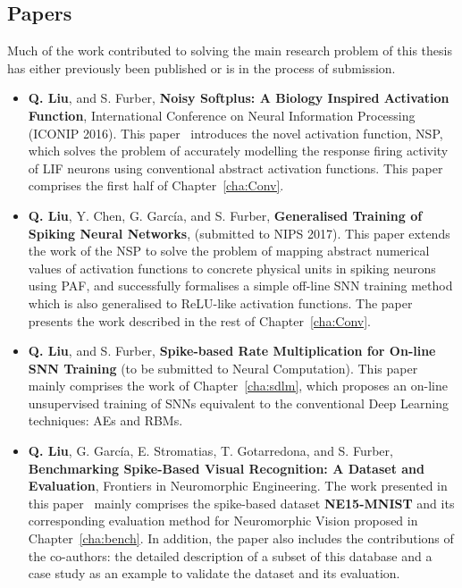 \subsection{Papers}
	Much of the work contributed to solving the main research problem of this thesis has either previously been published or is in the process of submission.
\begin{itemize}

	\item 
	\textbf{Q. Liu}, and S. Furber, \textbf{Noisy Softplus: A Biology Inspired Activation Function}, International Conference on Neural Information Processing (ICONIP 2016). 
	This paper~\citep{liu2016noisy} introduces the novel activation function, NSP, 
	which solves the problem of accurately modelling the response firing activity of LIF neurons using conventional abstract activation functions.
	This paper comprises the first half of Chapter~\ref{cha:Conv}.
	
	\item 
	\textbf{Q. Liu}, Y. Chen, G. Garc\'ia, and S. Furber, \textbf{Generalised Training of Spiking Neural Networks}, (submitted to NIPS 2017).
	This paper extends the work of the NSP to solve the problem of mapping abstract numerical values of activation functions to concrete physical units in spiking neurons using PAF, and successfully formalises a simple off-line SNN training method which is also generalised to ReLU-like activation functions.
	The paper presents the work described in the rest of Chapter~\ref{cha:Conv}.
	
	
	\item 
	\textbf{Q. Liu}, and S. Furber, \textbf{Spike-based Rate Multiplication for On-line SNN Training} (to be submitted to Neural Computation).
	This paper mainly comprises the work of Chapter~\ref{cha:sdlm}, which proposes an on-line unsupervised training of SNNs equivalent to the conventional Deep Learning techniques: AEs and RBMs.
	
	\item 
	\textbf{Q. Liu}, G. Garc\'ia, E. Stromatias, T. Gotarredona, and S. Furber, \textbf{Benchmarking Spike-Based Visual Recognition: A Dataset and Evaluation}, Frontiers in Neuromorphic Engineering.
	The work presented in this paper~\citep{liu2016bench} mainly comprises the spike-based dataset \textbf{NE15-MNIST} and its corresponding evaluation method for Neuromorphic Vision proposed in Chapter~\ref{cha:bench}.
	In addition, the paper also includes the contributions of the co-authors: the detailed description of a subset of this database and a case study as an example to validate the dataset and its evaluation. 
	
\end{itemize}

